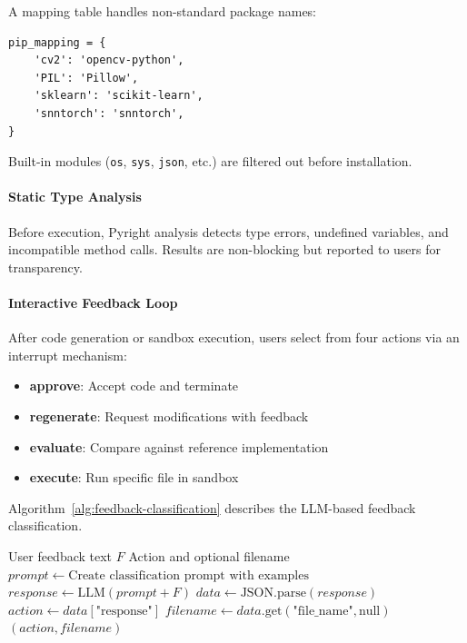 A mapping table handles non-standard package names:

\begin{verbatim}
pip_mapping = {
    'cv2': 'opencv-python',
    'PIL': 'Pillow',
    'sklearn': 'scikit-learn',
    'snntorch': 'snntorch',
}
\end{verbatim}

Built-in modules (\texttt{os}, \texttt{sys}, \texttt{json}, etc.) are filtered out before installation.

\paragraph{Static Type Analysis}
Before execution, Pyright analysis detects type errors, undefined variables, and incompatible method calls. Results are non-blocking but reported to users for transparency.

\paragraph{Interactive Feedback Loop}
After code generation or sandbox execution, users select from four actions via an interrupt mechanism:

\begin{itemize}
  \item \textbf{approve}: Accept code and terminate
  \item \textbf{regenerate}: Request modifications with feedback
  \item \textbf{evaluate}: Compare against reference implementation
  \item \textbf{execute}: Run specific file in sandbox
\end{itemize}

Algorithm~\ref{alg:feedback-classification} describes the LLM-based feedback classification.

\begin{algorithm}
\caption{Feedback Decision Classification}
\label{alg:feedback-classification}
\begin{algorithmic}[1]
\REQUIRE User feedback text \(F\)
\ENSURE Action and optional filename
\STATE \(prompt \gets \text{Create classification prompt with examples}\)
\STATE \(response \gets \text{LLM}(prompt + F)\)
\STATE \(data \gets \text{JSON.parse}(response)\)
\STATE \(action \gets data[\text{"response"}]\) 
\STATE \(filename \gets data.\text{get}(\text{"file\_name"}, \text{null})\)
\RETURN \((action, filename)\)
\end{algorithmic}
\end{algorithm}

